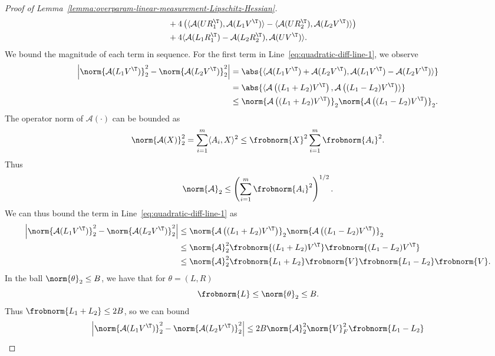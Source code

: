 \begin{proof}[Proof of Lemma~\ref{lemma:overparam-linear-measurement-Lipschitz-Hessian}]
\begin{align}
        &\quad + 4\left(\langle \mathcal{A}(UR_1^\T), \mathcal{A}(L_1V^\T)\rangle-\langle \mathcal{A}(UR_2^\T), \mathcal{A}(L_2V^\T)\rangle\right)\label{eq:quadratic-diff-line-3}\\ 
        & \quad + 4\langle \mathcal{A}(L_1 R_1^\T)-\mathcal{A}(L_2 R_2^\T), \mathcal{A}(UV^\T)\rangle. \label{eq:quadratic-diff-line-4}
    \end{align}
    We bound the magnitude of each term in sequence. For the first term in Line~\ref{eq:quadratic-diff-line-1}, we observe
    \begin{align*}
        \left|\norm{\mathcal{A}(L_1V^\T)}^2_2-\norm{\mathcal{A}(L_2V^\T)}^2_2\right| &= \abs{\langle \mathcal{A}(L_1V^\T)+\mathcal{A}(L_2V^\T), \mathcal{A}(L_1V^\T)-\mathcal{A}(L_2V^\T) \rangle}\\
        &= \abs{\langle \mathcal{A}\left((L_1+L_2)V^\T\right), \mathcal{A}\left((L_1-L_2)V^\T\right) \rangle}\\
        &\leq \norm{\mathcal{A}\left((L_1+L_2)V^\T\right)}_2 \norm{\mathcal{A}\left((L_1-L_2)V^\T\right)}_2.
    \end{align*}
    The operator norm of $\mathcal{A}(\cdot)$ can be bounded as
    \[
        \norm{\mathcal{A}(X)}^2_2 = \sum_{i=1}^m \langle A_i, X\rangle^2 \leq \frobnorm{X}^2 \sum_{i=1}^m \frobnorm{A_i}^2.
    \]
    Thus
    \begin{equation}\label{eq:linear-measurement-map-2-norm}
        \norm{\mathcal{A}}_2 \leq \left(\sum_{i=1}^m \frobnorm{A_i}^2\right)^{1/2}.
    \end{equation}
    We can thus bound the term in Line~\ref{eq:quadratic-diff-line-1} as
    \begin{align*}
        \left|\norm{\mathcal{A}(L_1V^\T)}^2_2-\norm{\mathcal{A}(L_2V^\T)}^2_2\right| &\leq \norm{\mathcal{A}\left((L_1+L_2)V^\T\right)}_2 \norm{\mathcal{A}\left((L_1-L_2)V^\T\right)}_2\\
        &\leq \norm{\mathcal{A}}^2_2 \frobnorm{(L_1+L_2)V^\T} \frobnorm{(L_1-L_2)V^\T} \\
        &\leq \norm{\mathcal{A}}^2_2 \frobnorm{L_1+L_2} \frobnorm{V} \frobnorm{L_1-L_2} \frobnorm{V}.
    \end{align*}
    In the ball $\norm{\theta}_2 \leq B$, we have that for $\theta = (L, R)$
     \[
        \frobnorm{L} \leq \norm{\theta}_2 \leq B.
     \]
    Thus $\frobnorm{L_1+L_2} \leq 2B$, so we can bound
    \begin{align*}
        \left|\norm{\mathcal{A}(L_1V^\T)}^2_2-\norm{\mathcal{A}(L_2V^\T)}^2_2\right| &\leq 2B \norm{\mathcal{A}}^2_2 \norm{V}^2_F \frobnorm{L_1-L_2} \\

\end{align*}
\end{proof}

